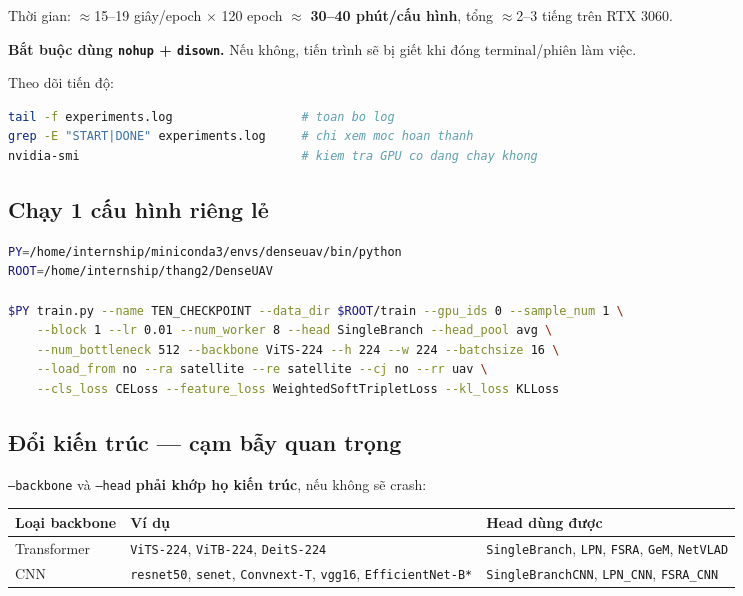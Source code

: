 \documentclass[11pt]{article}
\newcommand{\cmd}[1]{\texttt{\footnotesize #1}}
\begin{document}
Thời gian: $\approx$15--19 giây/epoch $\times$ 120 epoch $\approx$ \textbf{30--40 phút/cấu hình}, tổng $\approx$2--3 tiếng trên RTX 3060.

\textbf{Bắt buộc dùng \texttt{nohup} + \texttt{disown}.} Nếu không, tiến trình sẽ bị giết khi đóng terminal/phiên làm việc.

Theo dõi tiến độ:

\begin{lstlisting}[language=bash]
tail -f experiments.log                  # toan bo log
grep -E "START|DONE" experiments.log     # chi xem moc hoan thanh
nvidia-smi                               # kiem tra GPU co dang chay khong
\end{lstlisting}

\subsection{Chạy 1 cấu hình riêng lẻ}

\begin{lstlisting}[language=bash]
PY=/home/internship/miniconda3/envs/denseuav/bin/python
ROOT=/home/internship/thang2/DenseUAV

$PY train.py --name TEN_CHECKPOINT --data_dir $ROOT/train --gpu_ids 0 --sample_num 1 \
    --block 1 --lr 0.01 --num_worker 8 --head SingleBranch --head_pool avg \
    --num_bottleneck 512 --backbone ViTS-224 --h 224 --w 224 --batchsize 16 \
    --load_from no --ra satellite --re satellite --cj no --rr uav \
    --cls_loss CELoss --feature_loss WeightedSoftTripletLoss --kl_loss KLLoss
\end{lstlisting}

\subsection{Đổi kiến trúc --- cạm bẫy quan trọng}

\texttt{--backbone} và \texttt{--head} \textbf{phải khớp họ kiến trúc}, nếu không sẽ crash:

\begin{center}
\begin{tabularx}{\textwidth}{lLL}
\toprule
\textbf{Loại backbone} & \textbf{Ví dụ} & \textbf{Head dùng được} \\
\midrule
Transformer & \cmd{ViTS-224}, \cmd{ViTB-224}, \cmd{DeitS-224} & \cmd{SingleBranch}, \cmd{LPN}, \cmd{FSRA}, \cmd{GeM}, \cmd{NetVLAD} \\
\addlinespace
CNN & \cmd{resnet50}, \cmd{senet}, \cmd{Convnext-T}, \cmd{vgg16}, \cmd{EfficientNet-B*} & \cmd{SingleBranchCNN}, \cmd{LPN\_CNN}, \cmd{FSRA\_CNN} \\
\bottomrule
\end{tabularx}
\end{center}
\end{document}
